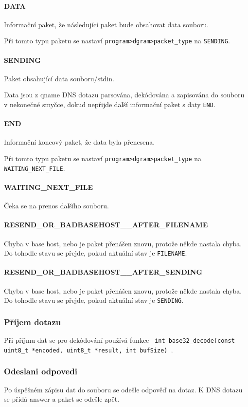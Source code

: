 \paragraph{DATA}
Informační paket, že následující paket bude obsahovat data souboru.

Při tomto typu paketu se nastaví \texttt{program\->dgram\->packet\_type} na \texttt{SENDING}.

\paragraph{SENDING}
Paket obsahující data souboru/stdin.

Data jsou z qname DNS dotazu parsována, dekódována a
zapisována do souboru v nekonečné smyčce, dokud nepřijde další
informační paket s daty \texttt{END}.

\paragraph{END}
Informační koncový paket, že data byla přenesena.

Při tomto typu paketu se nastaví \texttt{program\->dgram\->packet\_type} na \texttt{WAITING\_NEXT\_FILE}.

\paragraph{WAITING\_NEXT\_FILE}
Čeka se na prenos dalšího souboru.

\paragraph{RESEND\_OR\_BADBASEHOST\_\_AFTER\_FILENAME}
Chyba v base host, nebo je paket přenášen znovu, protože někde nastala chyba.
Do tohodle stavu se přejde, pokud aktuální stav je \texttt{FILENAME}.

\paragraph{RESEND\_OR\_BADBASEHOST\_\_AFTER\_SENDING}
Chyba v base host, nebo je paket přenášen znovu, protože někde nastala chyba.
Do tohodle stavu se přejde, pokud aktuální stav je \texttt{SENDING}.

\subsubsection{Příjem dotazu} \label{sec:odeslani-dotazu-s}
Při příjmu dat se pro dekódování používá funkce
\texttt{ int base32\_decode(const uint8\_t *encoded, uint8\_t *result, int bufSize) }\cite{encodingData}.

\subsubsection{Odeslani odpovedi}\label{sec:prijimani-odpovedi-s}
Po úspěšném zápisu dat do souboru se odešle odpověď na dotaz.
K DNS dotazu se přidá answer a paket se odešle zpět.
